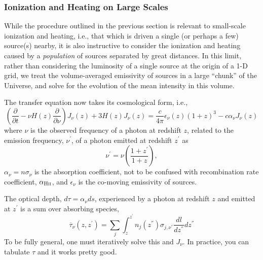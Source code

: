 %



\subsubsection{Ionization and Heating on Large Scales} \label{sec:largescales}
While the procedure outlined in the previous section is relevant to small-scale ionization and heating, i.e., that which is driven a single (or perhaps a few) source(s) nearby, it is also instructive to consider the ionization and heating caused by a \textit{population} of sources separated by great distances. In this limit, rather than considering the luminosity of a single source at the origin of a 1-D grid, we treat the volume-averaged emissivity of sources in a large ``chunk'' of the Universe, and solve for the evolution of the mean intensity in this volume. 

The transfer equation now takes its cosmological form, i.e., 
\begin{equation}
    \left(\frac{\partial}{\partial t} - \nu H(z) \frac{\partial}{\partial \nu} \right) J_{\nu}(z) + 3 H(z) J_{\nu}(z) =  \frac{c}{4\pi} \epsilon_{\nu}(z) (1 + z)^3 - c \alpha_{\nu} J_{\nu}(z) \label{eq:rte_diffeq}
\end{equation}
where $\nu$ is the observed frequency of a photon at redshift $z$, related to the emission frequency, $\nu^{\prime}$, of a photon emitted at redshift $z^{\prime}$ as
\begin{equation}
    \nu^{\prime} = \nu \left(\frac{1 + z^{\prime}}{1 + z}\right) , \label{eq:EmissionFrequency}
\end{equation}
$\alpha_{\nu} = n \sigma_{\nu}$ is the absorption coefficient, not to be confused with recombination rate coefficient, $\alpha_{\text{H} {\textsc{ii}}}$, and $\epsilon_{\nu}$ is the co-moving emissivity of sources.

The optical depth, $d\tau = \alpha_{\nu} ds$, experienced by a photon at redshift $z$ and emitted at $z^{\prime}$ is a sum over absorbing species,
\begin{equation}
    \overline{\tau}_{\nu}(z, z^{\prime}) = \sum_j \int_{z}^{z^{\prime}} n_j(z^{\dprime}) \sigma_{j, \nu^{\dprime}} \frac{dl}{dz^{\dprime}}dz^{\dprime} \label{eq:tau_igm}
\end{equation}
To be fully general, one must iteratively solve this and $J_{\nu}$. In practice, you can tabulate $\tau$ and it works pretty good.


